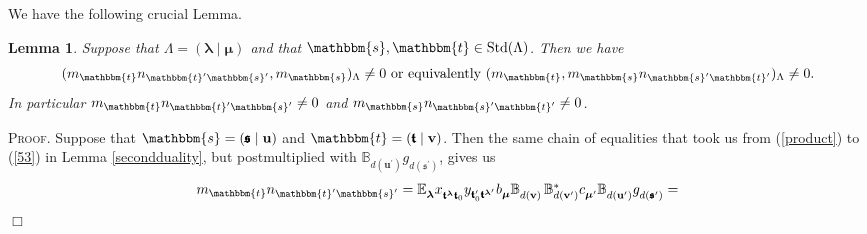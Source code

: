 \documentclass[10pt,a4,twoside,hidelinks,rm]{article}
\newcommand{\BB}{\mathbb{B}}
\newcommand\es{\mathbbm{s}}
\newcommand\et{\mathbbm{t}}
\newcommand\bu{\mathbf{u}}
\newcommand\bv{\mathbf{v}}
\newcommand{\s}{\mathfrak{s}}
\newcommand{\T}{\mathfrak{t}}
\newcommand{\bT}{\pmb{\mathfrak{t}}}
\newcommand{\Bs}{\pmb{\mathfrak{s}}}
\newcommand{\std}{{\rm Std}}
\newcommand\blambda{{\boldsymbol\lambda}}
\newcommand\be{\mathbb{E}}
\newcommand\bmu{{\boldsymbol\mu}}
\theoremstyle{plain}
\newtheorem{lem}[teo]{Lemma}
\newenvironment{demo}
{\textsc{Proof.}} {\quad \hfill $\Box$}
\begin{document}
\medskip
We have the following crucial Lemma. 
\begin{lem}\label{samespirit}
Suppose that $ \Lambda =(\blambda \mid \bmu )  $ and 
that $ \es, \et \in \std(\Lambda) $. Then we have 
\begin{equation}
  ( m_{ \et } n_{ \et^{\prime} \es^{\prime}     } , m_{\es})_{\Lambda} \neq 0 \mbox{  or equivalently  }
( m_{ \et }  , m_{\es}    n_{ \es^{\prime} \et^{\prime}     })_{\Lambda} \neq 0  .
\end{equation}  
In particular
$ m_{ \et } n_{ \et^{\prime} \es^{\prime}     } \neq 0$ and
$  m_{\es}    n_{ \es^{\prime} \et^{\prime}     } \neq 0$.
\end{lem}
\begin{demo}
Suppose that $ \es = (\Bs \mid \bu) $ and $ \et = (\bT \mid \bv) $. 
Then the same 
chain of equalities that took us from 
(\ref{product}) to (\ref{53}) in Lemma \ref{secondduality},
but postmultiplied with
$ \BB^{}_{d(\bu^{\prime})} g^{}_{d(\Bs^{\prime})}$, 
gives us 
\begin{equation}\label{byreducingto}
\begin{array}{l}
  m_{\et } n_{ \et^{\prime} \es^{\prime}     } = 
\be^{}_{\blambda}
 x^{}_{\bT^{\blambda}  \bT_0} y_{ \bT_0^{\prime}     \bT^{\blambda^{\prime} }}
  b^{}_{\bmu}\BB^{}_{d(\bv)}  \,
\BB_{d(\bv^{\prime})}^{\ast} 
c^{}_{\bmu^{\prime}}  \BB^{}_{d(\bu^{\prime})} g^{}_{d(\Bs^{\prime})} = \\ 

\end{array}
\end{equation}
\end{demo}
\end{document}
